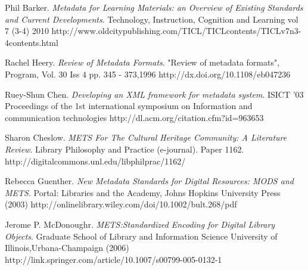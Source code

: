 \documentclass[a4paper]{article} %
\begin{document}
\begin{thebibliography}{99}
	Phil Barker.
	\newblock \emph{Metadata for Learning Materials: an Overview of Existing Standards and Current Developments}.
	\newblock Technology, Instruction, Cognition and Learning vol 7 (3-4) 2010
	\newblock http://www.oldcitypublishing.com/TICL/TICLcontents/TICLv7n3-4contents.html
	
	
	Rachel Heery.
	\newblock \emph{Review of Metadata Formats}.
	\newblock "Review of metadata formats", Program, Vol. 30 Iss 4 pp. 345 - 373,1996
	\newblock http://dx.doi.org/10.1108/eb047236
	
	Ruey-Shun Chen.
	\newblock \emph{Developing an XML framework for metadata system}.
	\newblock ISICT '03 Proceedings of the 1st international symposium on Information and communication technologies
	\newblock http://dl.acm.org/citation.cfm?id=963653
	
	Sharon Cheslow.
	\newblock \emph{METS For The Cultural Heritage Community: A	Literature Review}.
	\newblock Library Philosophy and Practice (e-journal). Paper 1162.
	\newblock http://digitalcommons.unl.edu/libphilprac/1162/
	
	Rebecca Guenther.
	\newblock \emph{New Metadata Standards for Digital Resources: MODS and METS}.
	\newblock Portal: Libraries and the Academy, Johns Hopkins University Press (2003)
	\newblock http://onlinelibrary.wiley.com/doi/10.1002/bult.268/pdf
	
	Jerome P. McDonoughr.
	\newblock \emph{METS:Standardized Encoding for Digital Library Objects}.
	\newblock Graduate School of Library and Information Science
	University of Illinois,Urbana-Champaign (2006)
	\newblock 
    http://link.springer.com/article/10.1007/s00799-005-0132-1
	
\end{thebibliography}


\clearpage %
\end{document}
